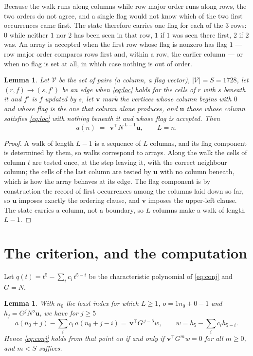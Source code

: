 \documentclass[11pt,a4paper]{article}
\theoremstyle{plain}
\newtheorem{lemma}[theorem]{Lemma}
\theoremstyle{definition}
\begin{document}
Because the walk runs along columns while row major order runs along
rows, the two orders do not agree, and a single flag would not know which of the two
first occurrences came first. The state therefore carries one flag for each of the $3$
rows: $0$ while neither $1$ nor $2$ has been seen in that row, $1$ if $1$
was seen there first, $2$ if $2$ was. An array is accepted when the first row whose
flag is nonzero has flag $1$ --- row major order compares rows first and, within a
row, the earlier column --- or when no flag is set at all, in which case nothing is out of
order.

\begin{lemma}\label{lem:walk}
Let $\mathcal V$ be the set of pairs (a column, a flag vector), $|\mathcal V|=S=1728$, let
$(r,f)\to(s,f')$ be an edge when \eqref{eq:loc} holds for the cells of $r$ with $s$ beneath
it and $f'$ is $f$ updated by $s$, let $\mathbf{v}$ mark the vertices whose column begins
with $0$ and whose flag is the one that column alone produces, and $\mathbf{u}$ those whose
column satisfies \eqref{eq:loc} with nothing beneath it and whose flag is accepted. Then
\[
a(n)\;=\;\,\mathbf{v}^{\!\top}N^{\,L-1}\mathbf{u},\qquad L=n.
\]
\end{lemma}

\begin{proof}
A walk of length $L-1$ is a sequence of $L$ columns, and its flag component is determined by
them, so walks correspond to arrays. Along the walk the cells of column $t$ are tested once,
at the step leaving it, with the correct neighbour column; the cells of the last column are
tested by $\mathbf{u}$ with no column beneath, which is how the array behaves at its edge.
The flag component is by construction the record of first occurrences among the columns laid
down so far, so $\mathbf{u}$ imposes exactly the ordering clause, and $\mathbf{v}$ imposes
the upper-left clause. The state carries a column, not a boundary, so $L$ columns make a walk
of length $L-1$.
\end{proof}

\section{The criterion, and the computation}

Let $q(t)=t^{5}-\sum_i c_i\,t^{5-i}$ be the characteristic polynomial of
\eqref{eq:conj} and $G=N$.

\begin{lemma}\label{lem:crit}
With $n_0$ the least index for which $L\ge1$, $o=1n_0+0-1$ and
$h_j=G^{j}N^{o}\mathbf{u}$, we have for $j\ge5$
\[
a(n_0+j)-\sum_i c_i\,a(n_0+j-i)=\,\mathbf{v}^{\!\top}G^{\,j-5}w,
\qquad w=h_{5}-\sum_i c_ih_{5-i} .
\]
Hence \eqref{eq:conj} holds from that point on if and only if
$\mathbf{v}^{\!\top}G^{m}w=0$ for all $m\ge0$, and $m<S$ suffices.
\end{lemma}
\end{document}
